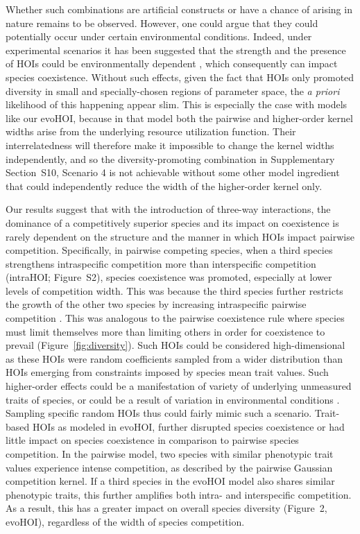 \documentclass[11pt]{article}
\newcommand{\SI}{Supplementary}
\begin{document}
Whether such combinations are artificial constructs or have a chance of arising in nature remains to be observed. However, one could argue that they could potentially occur under certain environmental conditions. Indeed, under experimental scenarios it has been suggested that the strength and the presence of HOIs could be environmentally dependent \citep{fox_existence_2023}, which consequently can impact species coexistence. Without such effects, given the fact that HOIs only promoted diversity in small and specially-chosen regions of parameter space, the \emph{a priori} likelihood of this happening appear slim. This is especially the case with models like our evoHOI, because in that model both the pairwise and higher-order kernel widths arise from the underlying resource utilization function. Their interrelatedness will therefore make it impossible to change the kernel widths independently, and so the diversity-promoting combination in \SI{} Section~S10, Scenario 4 is not achievable without some other model ingredient that could independently reduce the width of the higher-order kernel only.
 
Our results suggest that with the introduction of three-way interactions, the dominance of a competitively superior species and its impact on coexistence is rarely dependent on the structure and the manner in which HOIs impact pairwise competition. Specifically, in pairwise competing species, when a third species strengthens intraspecific competition more than interspecific competition (intraHOI; Figure~S2), species coexistence was promoted, especially at lower levels of competition width. This was because the third species further restricts the growth of the other two species by increasing intraspecific pairwise competition \citep{singh_higher_2021}.  This was analogous to the pairwise coexistence rule where species must limit themselves more than limiting others in order for coexistence to prevail (Figure~\ref{fig:diversity}). Such HOIs could be considered high-dimensional as these HOIs were random coefficients sampled from a wider distribution than HOIs emerging from constraints imposed by species mean trait values. Such higher-order effects could be a manifestation of variety of underlying unmeasured traits of species, or could be a result of variation in environmental conditions \citep{fox_existence_2023}. Sampling specific random HOIs thus could fairly mimic such a scenario. Trait-based HOIs as modeled in evoHOI, further disrupted species coexistence or had little impact on species coexistence in comparison to pairwise species competition. In the pairwise model, two species with similar phenotypic trait values experience intense competition, as described by the pairwise Gaussian competition kernel. If a third species in the evoHOI model also shares similar phenotypic traits, this further amplifies both intra- and interspecific competition. As a result, this has a greater impact on overall species diversity (Figure~2, evoHOI), regardless of the width of species competition.
\end{document}

